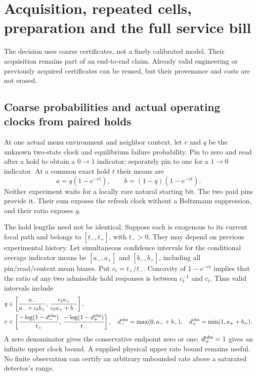 \section{Acquisition, repeated cells, preparation and the full service bill}
\label{sec:acquisition}
The decision uses coarse certificates, not a finely calibrated model. Their acquisition remains part of an end-to-end claim. Already valid engineering or previously acquired certificates can be reused, but their provenance and costs are not erased.

\subsection{Coarse probabilities and actual operating clocks from paired holds}
At one actual menu environment and neighbor context, let $r$ and $q$ be the unknown two-state clock and equilibrium failure probability. Pin to zero and read after a hold to obtain a $0\to1$ indicator; separately pin to one for a $1\to0$ indicator. At a common exact hold $t$ their means are
\begin{equation}
 a=q(1-e^{-rt}),\qquad b=(1-q)(1-e^{-rt}).
 \label{eq:calpair}
\end{equation}
Neither experiment waits for a locally rare natural starting bit. The two paid pins provide it. Their sum exposes the refresh clock without a Boltzmann suppression, and their ratio exposes $q$.

The hold lengths need not be identical. Suppose each is exogenous to its current focal path and belongs to $[t_-,t_+]$, with $t_->0$. They may depend on previous experimental history. Let simultaneous confidence intervals for the conditional average indicator means be $[a_-,a_+]$ and $[b_-,b_+]$, including all pin/read/context mean biases. Put $c_t=t_+/t_-$. Concavity of $1-e^{-rt}$ implies that the ratio of any two admissible hold responses is between $c_t^{-1}$ and $c_t$. Thus valid intervals include
\begin{align}
 q&\in\left[\frac{a_-}{a_-+c_t b_+},\,
             \frac{c_t a_+}{c_t a_++b_-}\right],\label{eq:qinterval}\\
 r&\in\left[\frac{-\log(1-d_-^{\rm obs})}{t_+},\,
             \frac{-\log(1-d_+^{\rm obs})}{t_-}\right],
 \quad d_-^{\rm obs}=\max(0,a_-+b_-),\quad
 d_+^{\rm obs}=\min(1,a_++b_+).
 \label{eq:rinterval}
\end{align}
A zero denominator gives the conservative endpoint zero or one; $d_+^{\rm obs}=1$ gives an infinite upper clock bound. A supplied physical upper rate bound remains useful. No finite observation can certify an arbitrary unbounded rate above a saturated detector's range.

